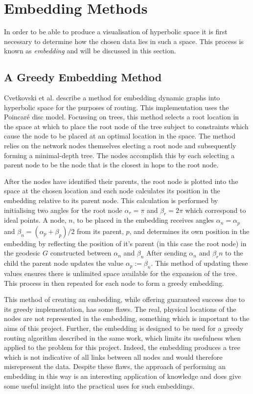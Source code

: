 \section{Embedding Methods}
In order to be able to produce a visualisation of hyperbolic space it is first necessary to determine how the chosen data lies in such a space. This process is known as \textit{embedding} and will be discussed in this section.

\subsection{A Greedy Embedding Method}

Cvetkovski et al. \cite{cvetkovski_hyperbolic_2009} describe a method for embedding dynamic graphs into hyperbolic space for the purposes of routing. This implementation uses the Poincar\'{e} disc model. Focussing on trees, this method selects a root location in the space at which to place the root node of the tree subject to constraints which cause the node to be placed at an optimal location in the space. The method relies on the network nodes themselves electing a root node and subsequently forming a minimal-depth tree. The nodes accomplish this by each selecting a parent node to be the node that is the closest in hops to the root node. 

After the nodes have identified their parents, the root node is plotted into the space at the chosen location and each node calculates its position in the embedding relative to its parent node. This calculation is performed by initialising two angles for the root node $\alpha_r = \pi$ and $\beta_r = 2\pi$ which correspond to ideal points. A node, $n$, to be placed in the embedding receives angles $\alpha_n = \alpha_p$ and $\beta_n = (\alpha_p + \beta_p) /2$ from its parent, $p$, and determines its own position in the embedding by reflecting the position of it's parent (in this case the root node) in the geodesic $G$ constructed between $\alpha_n$ and $\beta_n$ After sending $\alpha_n$ and $\beta_rn$ to the child the parent node updates the value $\alpha_p := \beta_n$. This method of updating these values ensures there is unlimited space available for the expansion of the tree. This process in then repeated for each node to form a greedy embedding. 

This method of creating an embedding, while offering guaranteed success due to its greedy implementation, has some flaws. The real, physical locations of the nodes are not represented in the embedding, something which is important to the aims of this project. Further, the embedding is designed to be used for a greedy routing algorithm described in the same work, which limits its usefulness when applied to the problem for this project. Indeed, the embedding produces a tree which is not indicative of all links between all nodes and would therefore misrepresent the data. Despite these flaws, the approach of performing an embedding in this way is an interesting application of knowledge and does give some useful insight into the practical uses for such embeddings. 

